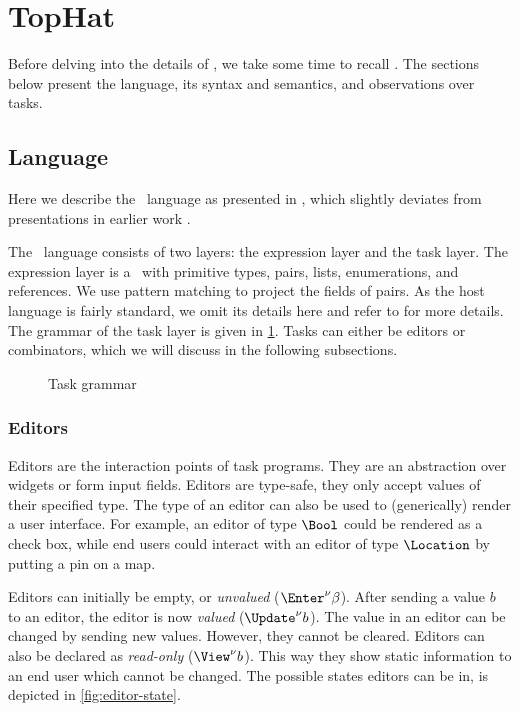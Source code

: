 
\section{TopHat}
\label{sec:tophat}

Before delving into the details of \DYNTOPHAT, we take some time to recall \TOPHAT.
The sections below present the language, its syntax and semantics, and observations over tasks.

\subsection{Language}

Here we describe the \TOPHAT\ language as presented in \citet{Steenvoorden22},
which slightly deviates from presentations in earlier work \cite{conf/ppdp/SteenvoordenNK19,conf/ifl/NausSK19,conf/sfp/NausS20}.

The \TOPHAT\ language consists of two layers: the expression layer and the task layer.
The expression layer is a \STLC\ with primitive types, pairs, lists, enumerations, and references.
We use pattern matching to project the fields of pairs.
As the host language is fairly standard, we omit its details here
and refer to \citet{Steenvoorden22} for more details.
The grammar of the task layer is given in \cref{fig:task-grammar}.
Tasks can either be editors or combinators,
which we will discuss in the following subsections.

\begin{figure}
  \caption{Task grammar}
  \label{fig:task-grammar}
\end{figure}

\subsubsection{Editors}

Editors are the interaction points of task programs.
They are an abstraction over widgets or form input fields.
Editors are type-safe,
they only accept values of their specified type.
The type of an editor can also be used to (generically) render a user interface.
For example,
an editor of type $\Bool$ could be rendered as a check box,
while end users could interact with an editor of type $\Location$ by putting a pin on a map.

Editors can initially be empty, or \emph{unvalued} ($\Enter^\nu \beta$).
After sending a value $b$ to an editor, the editor is now \emph{valued} ($\Update^\nu b$).
The value in an editor can be changed by sending new values.
However, they cannot be cleared.
Editors can also be declared as \emph{read-only} ($\View^\nu b$).
This way they show static information to an end user which cannot be changed.
The possible states editors can be in, is depicted in \cref{fig:editor-state}.

